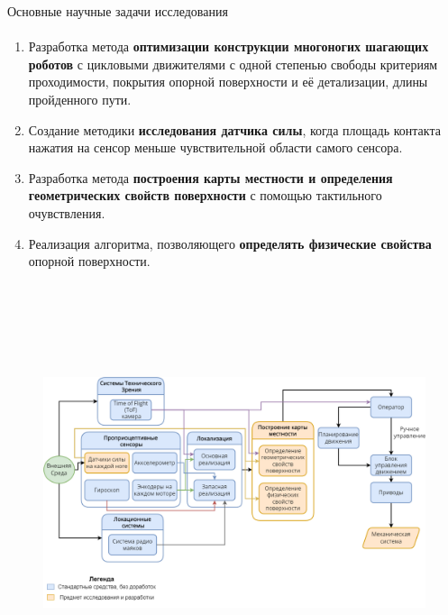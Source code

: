 \documentclass[aspectratio=169,xcolor=table]{beamer}
\newcommand{\fbckg}[1]{\usebackgroundtemplate{\texttt{[image: \#1]}}}%
\begin{document}
\begin{frame}[t]{Основные научные задачи исследования}
    \framesubtitle{}
    \begin{enumerate}
        \item Разработка метода \textbf{оптимизации конструкции многоногих шагающих роботов} с цикловыми движителями с одной степенью свободы критериям проходимости, покрытия опорной поверхности и её детализации, длины пройденного пути.
        \item Создание методики \textbf{исследования датчика силы}, когда площадь контакта нажатия на сенсор меньше чувствительной области самого сенсора.
        \item  Разработка метода \textbf{построения карты местности и определения геометрических свойств поверхности} с помощью тактильного очувствления.
        \item Реализация алгоритма, позволяющего \textbf{определять физические свойства} опорной поверхности.
    \end{enumerate}
\end{frame}


\usebackgroundtemplate{}
\begin{frame}[t]{}
    \framesubtitle{}
    \vspace{-0.4cm}
    \begin{figure}[H]
        \centering\includegraphics[height=12cm,width=1\textwidth,keepaspectratio]{main_diag_hor.png}
        \label{fig:main_diag_hor.png}
    \end{figure}
\end{frame}
\fbckg{fibeamer/figs/common.png}
\end{document}
